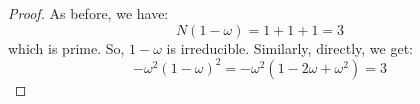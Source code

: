 \begin{proof}
    As before, we have:
    \[ N(1-\omega) = 1+1+1 = 3 \]
    which is prime. So, $1-\omega$ is irreducible. Similarly, directly, we get:
    \[ -\omega^2(1-\omega)^2 = -\omega^2(1-2\omega+\omega^2) = 3 \]
\end{proof}